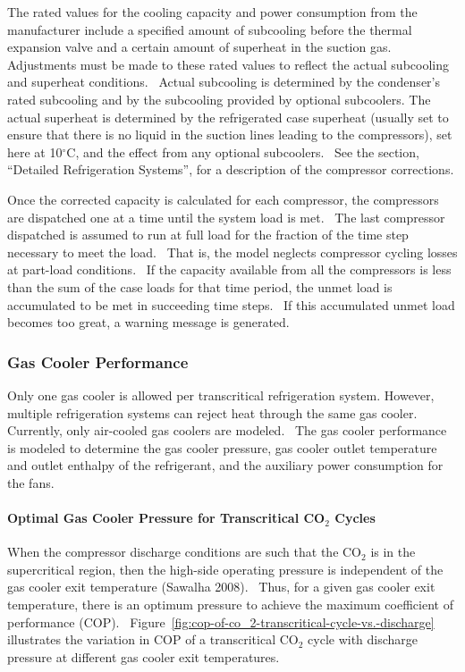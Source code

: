 The rated values for the cooling capacity and power consumption from the manufacturer include a specified amount of subcooling before the thermal expansion valve and a certain amount of superheat in the suction gas.~ Adjustments must be made to these rated values to reflect the actual subcooling and superheat conditions.~ Actual subcooling is determined by the condenser's rated subcooling and by the subcooling provided by optional subcoolers. The actual superheat is determined by the refrigerated case superheat (usually set to ensure that there is no liquid in the suction lines leading to the compressors), set here at 10\(^{\circ}\)C, and the effect from any optional subcoolers.~ See the section, ``Detailed Refrigeration Systems'', for a description of the compressor corrections.

Once the corrected capacity is calculated for each compressor, the compressors are dispatched one at a time until the system load is met.~ The last compressor dispatched is assumed to run at full load for the fraction of the time step necessary to meet the load.~ That is, the model neglects compressor cycling losses at part-load conditions.~ If the capacity available from all the compressors is less than the sum of the case loads for that time period, the unmet load is accumulated to be met in succeeding time steps.~ If this accumulated unmet load becomes too great, a warning message is generated.

\subsubsection{Gas Cooler Performance}\label{gas-cooler-performance}

Only one gas cooler is allowed per transcritical refrigeration system. However, multiple refrigeration systems can reject heat through the same gas cooler.~ Currently, only air-cooled gas coolers are modeled.~ The gas cooler performance is modeled to determine the gas cooler pressure, gas cooler outlet temperature and outlet enthalpy of the refrigerant, and the auxiliary power consumption for the fans.

\paragraph{Optimal Gas Cooler Pressure for Transcritical CO\(_{2}\) Cycles}\label{optimal-gas-cooler-pressure-for-transcritical-coux5f2-cycles}

When the compressor discharge conditions are such that the CO\(_{2}\) is in the supercritical region, then the high-side operating pressure is independent of the gas cooler exit temperature (Sawalha 2008).~ Thus, for a given gas cooler exit temperature, there is an optimum pressure to achieve the maximum coefficient of performance (COP).~ Figure~\ref{fig:cop-of-co_2-transcritical-cycle-vs.-discharge} illustrates the variation in COP of a transcritical CO\(_{2}\) cycle with discharge pressure at different gas cooler exit temperatures.

